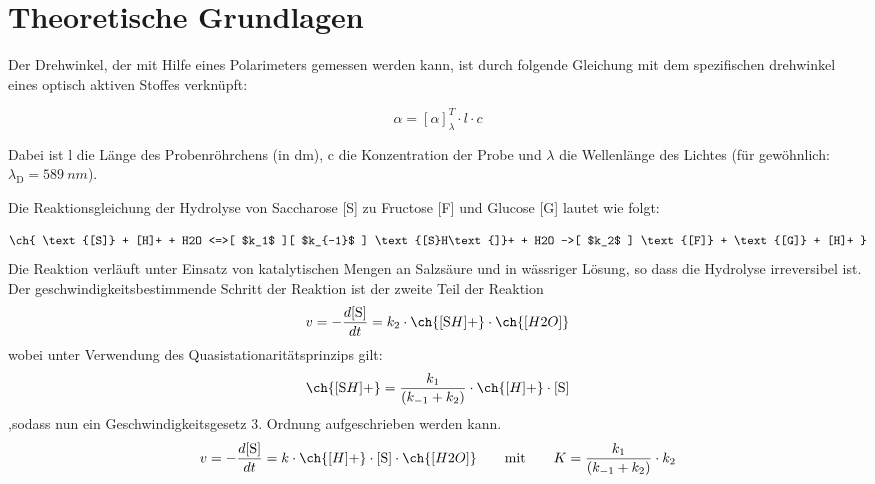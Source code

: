 \setlength\abovedisplayshortskip{20pt}
\setlength\belowdisplayshortskip{20pt}
\setlength\abovedisplayskip{20pt}
\setlength\belowdisplayskip{20pt}

\section{Theoretische Grundlagen \cite{wedler}}


Der Drehwinkel, der mit Hilfe eines Polarimeters gemessen werden kann, ist durch folgende Gleichung mit dem spezifischen drehwinkel eines optisch aktiven Stoffes verknüpft:

\begin{equation}
\alpha=\left[\alpha\right]_\lambda^T \cdot l \cdot c
\label{eq:Drehwinkelallgemein}
\end{equation}

Dabei ist l die Länge des Probenröhrchens (in dm), c die Konzentration der Probe und $\lambda$ die Wellenlänge des Lichtes (für gewöhnlich: $\lambda_\text{D}=589~\si{nm}$).

Die Reaktionsgleichung der Hydrolyse von Saccharose [S] zu Fructose [F] und Glucose [G] lautet wie folgt: 

\begin{equation}
\ch{ \text{[S]} + [H]+ + H2O <=>[ $k_1$ ][ $k_{-1}$ ] \text{[S}H\text{]}+ + H2O ->[ $k_2$ ] \text{[F]} + \text{[G]} + [H]+  }
\label{Hydrolysegleichung}
\end{equation}
Die Reaktion verläuft unter Einsatz von katalytischen Mengen an Salzsäure und in wässriger Lösung, so dass die Hydrolyse irreversibel ist. Der geschwindigkeitsbestimmende Schritt der Reaktion ist der zweite Teil der Reaktion
\begin{align}
v = - \frac{d \text{[S]}}{dt}= k_2 \cdot \ch{\text{[S}H\text{]}+} \cdot \ch{[H2O]}
\label{eq:irreversibler2.Schritt}
\end{align}
wobei unter Verwendung des Quasistationaritätsprinzips gilt:
\begin{align}
\ch{\text{[S}H\text{]}+}=\frac{k_1}{\left(k_{-1} + k_2\right)}
 \cdot \ch{\text{[}H\text{]}+} \cdot \text{[S]}
 \label{eq:quasistationfürSH+}
\end{align}
,sodass nun ein Geschwindigkeitsgesetz 3. Ordnung aufgeschrieben werden kann.
\begin{align}
v = - \frac{d \text{[S]}}{dt}= k \cdot \ch{\text{[}H\text{]}+} \cdot \text{[S]} \cdot \ch{[H2O]}
\quad\quad \text{mit}\quad\quad  K=\frac{k_1}{\left(k_{-1} + k_2\right)}
 \cdot k_2
 \label{eq:Gesetz3.Ordnung}
\end{align}

